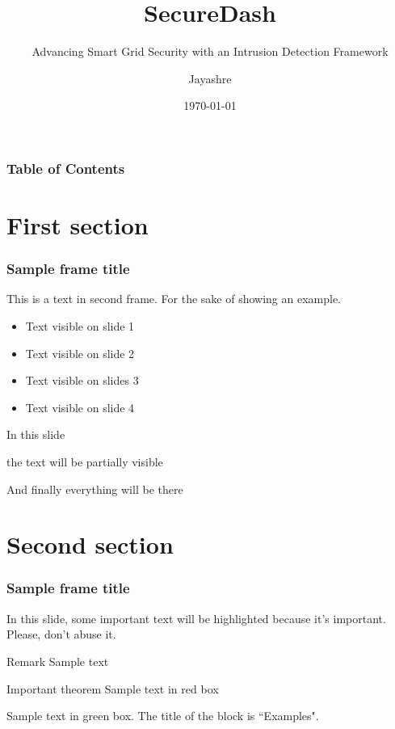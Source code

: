 \documentclass{beamer}
\author[Jayashre]{Jayashre}
\title[SecureDash]{SecureDash}
\subtitle{Advancing Smart Grid Security with an Intrusion Detection Framework}
\institute{Project Overview and Development}
\date{\today}
\begin{document}
\frame{\titlepage}


\begin{frame}
\frametitle{Table of Contents}
\tableofcontents
\end{frame}


\section{First section}

\begin{frame}
\frametitle{Sample frame title}
This is a text in second frame. For the sake of showing an example.

\begin{itemize}
    \item<1-> Text visible on slide 1
    \item<2-> Text visible on slide 2
    \item<3> Text visible on slides 3
    \item<4-> Text visible on slide 4
\end{itemize}
\end{frame}



\begin{frame}
In this slide \pause

the text will be partially visible \pause

And finally everything will be there
\end{frame}

\section{Second section}

\begin{frame}
\frametitle{Sample frame title}

In this slide, some important text will be
\alert{highlighted} because it's important.
Please, don't abuse it.

\begin{block}{Remark}
Sample text
\end{block}

\begin{alertblock}{Important theorem}
Sample text in red box
\end{alertblock}

\begin{examples}
Sample text in green box. The title of the block is ``Examples".
\end{examples}
\end{frame}
\end{document}
